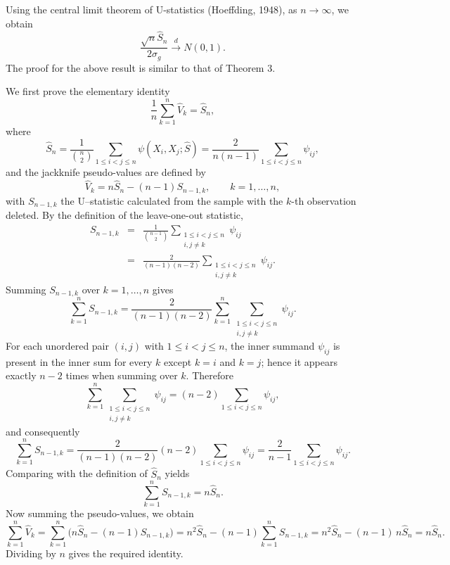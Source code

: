 \documentclass[11pt]{article}
\begin{document}
Using the central limit theorem of U-statistics (Hoeffding, 1948), as $n\rightarrow \infty$, we obtain
\begin{equation}\label{cltsenjel}
  \frac{\sqrt{n}\widehat{S}_n  }{2\sigma_{g}}\xrightarrow[]{d}N(0,1).
\end{equation}
\noindent The proof for the above result is similar to that of Theorem 3.

We first prove the elementary identity
$$
\frac{1}{n}\sum_{k=1}^n \widehat V_k = \widehat S_n,
$$
where
$$
\widehat S_n=\frac{1}{\binom{n}{2}}\sum_{1\le i<j\le n}\psi(X_i,X_j;\widehat S)
=\frac{2}{n(n-1)}\sum_{1\le i<j\le n}\psi_{ij},
$$
and the jackknife pseudo-values are defined by
$$
\widehat V_k = n\widehat S_n-(n-1)S_{n-1,k},\qquad k=1,\dots,n,
$$
with $S_{n-1,k}$ the U–statistic calculated  from the sample with the $k$-th observation deleted.
By the definition of the leave-one-out statistic,
\begin{eqnarray*}
    S_{n-1,k}
&=&\frac{1}{\binom{n-1}{2}}
\sum_{\substack{1\le i<j\le n\\ i,j\neq k}}\psi_{ij}\\
&=&\frac{2}{(n-1)(n-2)}
\sum_{\substack{1\le i<j\le n\\ i,j\neq k}}\psi_{ij}.
\end{eqnarray*}
Summing $S_{n-1,k}$ over $k=1,\dots,n$ gives
$$
\sum_{k=1}^n S_{n-1,k}
=\frac{2}{(n-1)(n-2)}
\sum_{k=1}^n
\sum_{\substack{1\le i<j\le n\\ i,j\neq k}}\psi_{ij}.
$$
For each unordered pair $(i,j)$ with $ 1\le i<j\le n$, the inner summand $\psi_{ij}$ is present in the inner sum for every $k$ except $k=i$ and $k=j$; hence it appears exactly $n-2$ times when summing over $k$. Therefore
$$
\sum_{k=1}^n
\sum_{\substack{1\le i<j\le n\\ i,j\neq k}}\psi_{ij}
=(n-2)\sum_{1\le i<j\le n}\psi_{ij},
$$
and consequently
$$\sum_{k=1}^n S_{n-1,k}
=\frac{2}{(n-1)(n-2)}(n-2)\sum_{1\le i<j\le n}\psi_{ij}
=\frac{2}{n-1}\sum_{1\le i<j\le n}\psi_{ij}.$$
Comparing with the definition of $\widehat S_n$ yields
$$\sum_{k=1}^n S_{n-1,k}=n\widehat S_n.$$
Now summing the  pseudo-values, we obtain
$$\sum_{k=1}^n \widehat V_k
=\sum_{k=1}^n\big(n\widehat S_n-(n-1)S_{n-1,k}\big)
= n^2\widehat S_n-(n-1)\sum_{k=1}^n S_{n-1,k}
= n^2\widehat S_n-(n-1)\,n\widehat S_n
= n\widehat S_n.$$
Dividing by $n$ gives the required identity.
\end{document}
